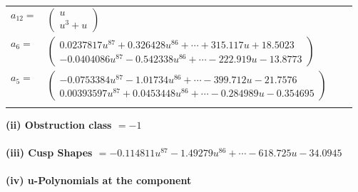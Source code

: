 \documentclass[1p]{elsarticle_modified}
\theoremstyle{definition}
\begin{document}
\begin{tabular}{m{7pt} m{180pt} m{7pt} m{180pt} }
\flushright $a_{12}=$&$\begin{pmatrix}u\\u^3+u\end{pmatrix}$ \\
\flushright $a_{6}=$&$\begin{pmatrix}0.0237817 u^{87}+0.326428 u^{86}+\cdots+315.117 u+18.5023\\-0.0404086 u^{87}-0.542338 u^{86}+\cdots-222.919 u-13.8773\end{pmatrix}$ \\
\flushright $a_{5}=$&$\begin{pmatrix}-0.0753384 u^{87}-1.01734 u^{86}+\cdots-399.712 u-21.7576\\0.00393597 u^{87}+0.0453448 u^{86}+\cdots-0.284989 u-0.354695\end{pmatrix}$\\&\end{tabular}
\flushleft \textbf{(ii) Obstruction class $= -1$}\\~\\
\flushleft \textbf{(iii) Cusp Shapes $= -0.114811 u^{87}-1.49279 u^{86}+\cdots-618.725 u-34.0945$}\\~\\
\newpage\renewcommand{\arraystretch}{1}
\flushleft \textbf{(iv) u-Polynomials at the component}\newline \\
\end{document}
